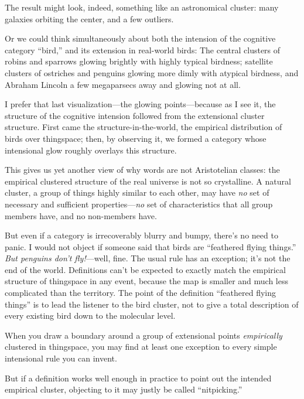 {{{
 The result might look, indeed, something like an astronomical
cluster: many galaxies orbiting the center, and a few outliers.}

{
 Or we could think simultaneously about both the intension of the
cognitive category ``bird,'' and its
extension in real-world birds: The central clusters of robins and
sparrows glowing brightly with highly typical birdness; satellite
clusters of ostriches and penguins glowing more dimly with atypical
birdness, and Abraham Lincoln a few megaparsecs away and glowing not at
all.}

{
 I prefer that last visualization---the glowing points---because as
I see it, the structure of the cognitive intension followed from the
extensional cluster structure. First came the structure-in-the-world,
the empirical distribution of birds over thingspace; then, by observing
it, we formed a category whose intensional glow roughly overlays this
structure.}

{
 This gives us yet another view of why words are not Aristotelian
classes: the empirical clustered structure of the real universe is not
so crystalline. A natural cluster, a group of things highly similar to
each other, may have \textit{no} set of necessary and sufficient
properties---\textit{no} set of characteristics that all group members
have, and no non-members have.}

{
 But even if a category is irrecoverably blurry and bumpy,
there's no need to panic. I would not object if someone
said that birds are ``feathered flying
things.'' \textit{But penguins don't
fly!}{}---well, fine. The usual rule has an exception;
it's not the end of the world. Definitions
can't be expected to exactly match the empirical
structure of thingspace in any event, because the map is smaller and
much less complicated than the territory. The point of the definition
``feathered flying things'' is to
lead the listener to the bird cluster, not to give a total description
of every existing bird down to the molecular level.}

{
 When you draw a boundary around a group of extensional points
\textit{empirically} clustered in thingspace, you may find at least one
exception to every simple intensional rule you can invent.}

{
 But if a definition works well enough in practice to point out the
intended empirical cluster, objecting to it may justly be called
``nitpicking.''}

\myendsectiontext


}}

